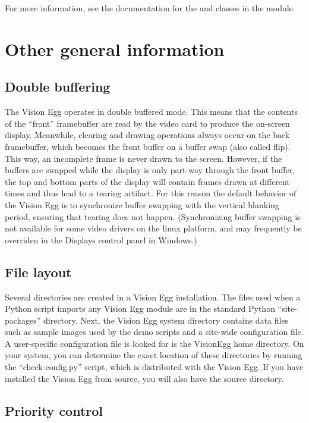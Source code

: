 \documentclass{manual}
\begin{document}
For more information, see the documentation for the 
and  classes in the 
module.

\chapter{Other general information \label{other info}}

\section{Double buffering}

The Vision Egg operates in double buffered mode.  This means that the
contents of the ``front'' framebuffer are read by the video card to
produce the on-screen display.  Meanwhile, clearing and drawing
operations always occur on the back framebuffer, which becomes the
front buffer on a buffer swap (also called flip).  This way, an
incomplete frame is never drawn to the screen.  However, if the
buffers are swapped while the display is only part-way through the
front buffer, the top and bottom parts of the display will contain
frames drawn at different times and thus lead to a tearing artifact.
For this reason the default behavior of the Vision Egg is to
synchronize buffer swapping with the vertical blanking period,
ensuring that tearing does not happen.  (Synchronizing buffer swapping
is not available for some video drivers on the linux platform, and may
frequently be overriden in the Displays control panel in Windows.)

\section{File layout}

Several directories are created in a Vision Egg installation.  The
files used when a Python script imports any Vision Egg module are in
the standard Python ``site-packages'' directory.  Next, the Vision Egg
system directory contains data files such as sample images used by the
demo scripts and a site-wide configuration file.  A user-specific
configuration file is looked for is the VisionEgg home directory.  On
your system, you can determine the exact location of these directories
by running the ``check-config.py'' script, which is distributed with
the Vision Egg.  If you have installed the Vision Egg from source, you
will also have the source directory.

\section{Priority control}
\end{document}
